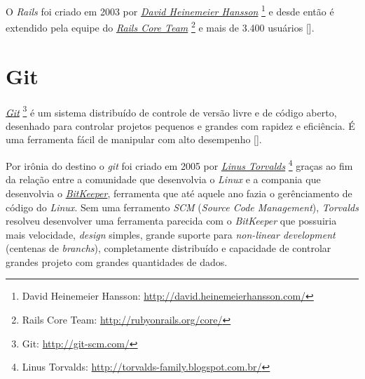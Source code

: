 O \emph{Rails} foi criado em 2003 por \emph{\href{http://david.heinemeierhansson.com/}{David Heinemeier Hansson}}
\footnote{David Heinemeier Hansson: \url{http://david.heinemeierhansson.com/}} e desde então é extendido 
pela equipe do \emph{\href{http://rubyonrails.org/core/}{Rails Core Team}} 
\footnote{Rails Core Team: \url{http://rubyonrails.org/core/}} e mais de 3.400 usuários 
[].

\section{Git}
\label{section:git}

\emph{\href{http://git-scm.com/}{Git}} \footnote{Git: \url{http://git-scm.com/}} é um sistema distribuído de 
controle de versão livre e de código aberto, desenhado para controlar projetos pequenos e grandes com 
rapidez e eficiência. É uma ferramenta fácil de manipular com alto desempenho [].

Por irônia do destino o \emph{git} foi criado em 2005 por 
\emph{\href{http://torvalds-family.blogspot.com.br/}{Linus Torvalds}} 
\footnote{Linus Torvalds: \url{http://torvalds-family.blogspot.com.br/}} graças ao fim da relação entre a 
comunidade que desenvolvia o \emph{Linux} e a compania que desenvolvia o 
\emph{\href{http://www.bitkeeper.com/}{BitKeeper}}, ferramenta que até aquele ano fazia o gerênciamento de 
código do \emph{Linux}. Sem uma ferramento \emph{SCM} (\emph{Source Code Management}), \emph{Torvalds} 
resolveu desenvolver uma ferramenta parecida com o \emph{BitKeeper} que possuiria mais velocidade,
\emph{design} simples, grande suporte para \emph{non-linear development} (centenas de \emph{branchs}), 
completamente distribuído e capacidade de controlar grandes projeto com grandes quantidades de dados.